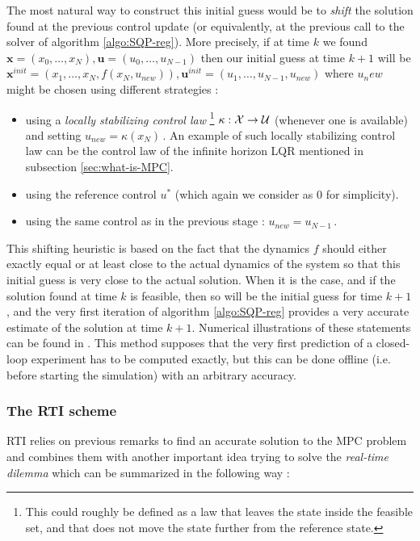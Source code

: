 \documentclass[12pt]{article}
\begin{document}
The most natural way to construct this initial guess would be to \textit{shift} the solution found at the previous control update (or equivalently, at the previous call to the solver of algorithm \ref{algo:SQP-reg}).
More precisely, if at time $k$ we found $\mathbf{x}=(x_0,\dots,x_N),\mathbf{u}=(u_0,\dots,u_{N-1})$ then our initial guess at time $k+1$ will be $\mathbf{x}^{init}=(x_1,\dots,x_N,f(x_N,u_{new})),\mathbf{u}^{init}=(u_1,\dots,u_{N-1},u_{new})$ where $u_new$ might be chosen using different strategies :
\begin{itemize}[label=\textbullet]
	\item using a \textit{locally stabilizing control law} \footnote{This could roughly be defined as a law that leaves the state inside the feasible set, and that does not move the state further from the reference state.} $\kappa:\cal{X}\to\cal{U}$ (whenever one is available) and setting $u_{new}=\kappa(x_N)$\,.
	An example of such locally stabilizing control law can be the control law of the infinite horizon LQR mentioned in subsection \ref{sec:what-is-MPC}.

	\item using the reference control $u^*$ (which again we consider as $0$ for simplicity).

 	\item using the same control as in the previous stage : $u_{new}=u_{N-1}$\,.
\end{itemize}

This shifting heuristic is based on the fact that the dynamics $f$ should either exactly equal or at least close to the actual dynamics of the system so that this initial guess is very close to the actual solution.
When it is the case, and if the solution found at time $k$ is feasible, then so will be the initial guess for time $k+1$, and the very first iteration of algorithm \ref{algo:SQP-reg} provides a very accurate estimate of the solution at time $k+1$.
Numerical illustrations of these statements can be found in \cite{mpc-rti}.
This method supposes that the very first prediction of a closed-loop experiment has to be computed exactly, but this can be done offline (i.e. before starting the simulation) with an arbitrary accuracy.

\subsubsection{The RTI scheme}

RTI relies on previous remarks to find an accurate solution to the MPC problem and combines them with another important idea trying to solve the \textit{real-time dilemma} which can be summarized in the following way :
\end{document}
